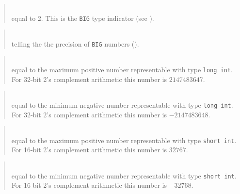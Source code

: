 \begin{quote}
\noindent{}\\ \hspace{0in}
equal to 2.
This is the {\tt BIG} type indicator (see ).
\end{quote}

\begin{quote}
\noindent{}\\ \hspace{0in}
telling the the precision of {\tt BIG} numbers ().
\end{quote}

\begin{quote}
\noindent{}\\ \hspace{0in}
equal to the maximum positive number representable with type {\tt long~int}.
For 32-bit 2's complement arithmetic this number is $2147483647$.
\end{quote}

\begin{quote}
\noindent{}\\ \hspace{0in}
equal to the minimum negative number representable with type {\tt long~int}.
For 32-bit 2's complement arithmetic this number is $-2147483648$.
\end{quote}

\begin{quote}
\noindent{}\\ \hspace{0in}
equal to the maximum positive number representable with type {\tt short~int}.
For 16-bit 2's complement arithmetic this number is 32767.
\end{quote}

\begin{quote}
\noindent{}\\ \hspace{0in}
equal to the minimum negative number representable with type {\tt short~int}.
For 16-bit 2's complement arithmetic this number is $-32768$.
\end{quote}

